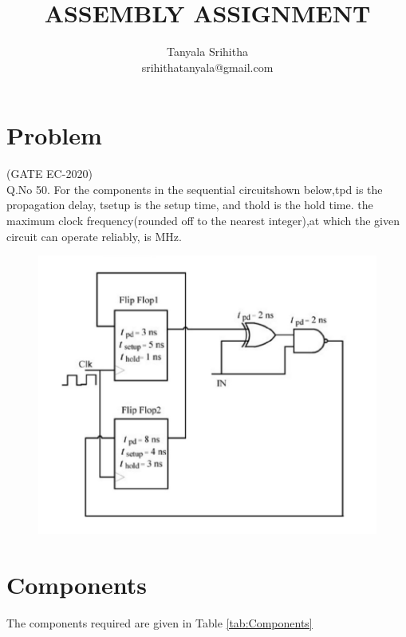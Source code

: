 \documentclass[journal,twocolumn,10pt, a4paper]{article}
\begin{document}
\lstset{                                   
language=C++,                             
basicstyle=\ttfamily\footnotesize,         
breaklines=true,                           
frame=lines}


\title{ASSEMBLY ASSIGNMENT}
\author{Tanyala Srihitha\\srihithatanyala@gmail.com}
\maketitle
\tableofcontents
 
\section{Problem}

(GATE EC-2020)\\

Q.No 50. For the components in the sequential circuitshown below,tpd is the propagation delay, tsetup is the setup time, and thold is the hold time. the maximum clock frequency(rounded off to the nearest integer),at which the given circuit can operate reliably, is        MHz.
\\


\begin{figure}[!h]
\includegraphics[width=\columnwidth]{./figs/ff.jpg}
\caption{}
\label{fig:Figure 1}
\end{figure}

\section{Components}
The components required are given in Table \ref{tab:Components}                    
\begin{table}[!h]
\centering

\caption{}
\label{tab:Components}                     
\end{table}
\end{document}
